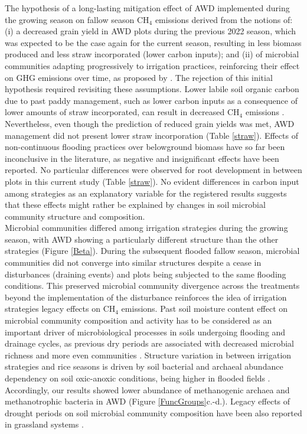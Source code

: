 The hypothesis of a long-lasting mitigation effect of AWD implemented during the growing season on fallow season CH$_{4}$ emissions derived from the notions of: (i) a decreased grain yield in AWD plots during the previous 2022 season, which was expected to be the case again for the current season, resulting in less biomass produced and less straw incorporated (lower carbon inputs); and (ii) of microbial communities adapting progressively to irrigation practices, reinforcing their effect on GHG emissions over time, as proposed by \cite{lagomarsino2016}. The rejection of this initial hypothesis required revisiting these assumptions. Lower labile soil organic carbon due to past paddy management, such as lower carbon inputs as a consequence of lower amounts of straw incorporated, can result in decreased CH$_{4}$ emissions \citep{hatala2012}. Nevertheless, even though the prediction of reduced grain yields was met, AWD management did not present lower straw incorporation (Table \ref{straw}). Effects of non-continuous flooding practices over belowground biomass have so far been inconclusive in the literature, as negative \citep{oliver2019} and insignificant \citep{carrijo2018} effects have been reported. No particular differences were observed for root development in between plots in this current study (Table \ref{straw}). No evident differences in carbon input among strategies as an explanatory variable for the registered results suggests that these effects might rather be explained by changes in soil microbial community structure and composition. \\

Microbial communities differed among irrigation strategies during the growing season, with AWD showing a particularly different structure than the other strategies (Figure \ref{Beta}). During the subsequent flooded fallow season, microbial communities did not converge into similar structures despite a cease in disturbances (draining events) and plots being subjected to the same flooding conditions. This preserved microbial community divergence across the treatments beyond the implementation of the disturbance reinforces the idea of irrigation strategies legacy effects on CH$_{4}$ emissions. Past soil moisture content effect on microbial community composition and activity has to be considered as an important driver of microbiological processes in soils undergoing flooding and drainage cycles, as previous dry periods are associated with decreased microbial richness and more even communities \citep{banerjee2016}. Structure variation in between irrigation strategies and rice seasons is driven by soil bacterial and archaeal abundance dependency on soil oxic-anoxic conditions, being higher in flooded fields \citep{breidenbach2014}. Accordingly, our results showed lower abundance of methanogenic archaea and methanotrophic bacteria in AWD \citep{hester2022} (Figure \ref{FuncGroups}c.-d.). Legacy effects of drought periods on soil microbial community composition have been also reported in grassland systems \citep{vilonen2023}.\\

